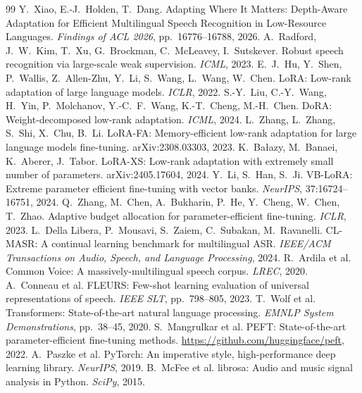 \documentclass[11pt,a4paper]{article}
\begin{document}
\begin{thebibliography}{99}\small
{} Y.~Xiao, E.-J.~Holden, T.~Dang. Adapting Where It Matters: Depth-Aware Adaptation for Efficient Multilingual Speech Recognition in Low-Resource Languages. \emph{Findings of ACL 2026}, pp.~16776--16788, 2026.
 A.~Radford, J.~W.~Kim, T.~Xu, G.~Brockman, C.~McLeavey, I.~Sutskever. Robust speech recognition via large-scale weak supervision. \emph{ICML}, 2023.
 E.~J.~Hu, Y.~Shen, P.~Wallis, Z.~Allen-Zhu, Y.~Li, S.~Wang, L.~Wang, W.~Chen. LoRA: Low-rank adaptation of large language models. \emph{ICLR}, 2022.
 S.-Y.~Liu, C.-Y.~Wang, H.~Yin, P.~Molchanov, Y.-C.~F.~Wang, K.-T.~Cheng, M.-H.~Chen. DoRA: Weight-decomposed low-rank adaptation. \emph{ICML}, 2024.
 L.~Zhang, L.~Zhang, S.~Shi, X.~Chu, B.~Li. LoRA-FA: Memory-efficient low-rank adaptation for large language models fine-tuning. arXiv:2308.03303, 2023.
 K.~Ba{\l}azy, M.~Banaei, K.~Aberer, J.~Tabor. LoRA-XS: Low-rank adaptation with extremely small number of parameters. arXiv:2405.17604, 2024.
 Y.~Li, S.~Han, S.~Ji. VB-LoRA: Extreme parameter efficient fine-tuning with vector banks. \emph{NeurIPS}, 37:16724--16751, 2024.
 Q.~Zhang, M.~Chen, A.~Bukharin, P.~He, Y.~Cheng, W.~Chen, T.~Zhao. Adaptive budget allocation for parameter-efficient fine-tuning. \emph{ICLR}, 2023.
 L.~Della Libera, P.~Mousavi, S.~Zaiem, C.~Subakan, M.~Ravanelli. CL-MASR: A continual learning benchmark for multilingual ASR. \emph{IEEE/ACM Transactions on Audio, Speech, and Language Processing}, 2024.
 R.~Ardila et al. Common Voice: A massively-multilingual speech corpus. \emph{LREC}, 2020.
 A.~Conneau et al. FLEURS: Few-shot learning evaluation of universal representations of speech. \emph{IEEE SLT}, pp.~798--805, 2023.
 T.~Wolf et al. Transformers: State-of-the-art natural language processing. \emph{EMNLP System Demonstrations}, pp.~38--45, 2020.
 S.~Mangrulkar et al. PEFT: State-of-the-art parameter-efficient fine-tuning methods. \url{https://github.com/huggingface/peft}, 2022.
 A.~Paszke et al. PyTorch: An imperative style, high-performance deep learning library. \emph{NeurIPS}, 2019.
 B.~McFee et al. librosa: Audio and music signal analysis in Python. \emph{SciPy}, 2015.
\end{thebibliography}
\end{document}
